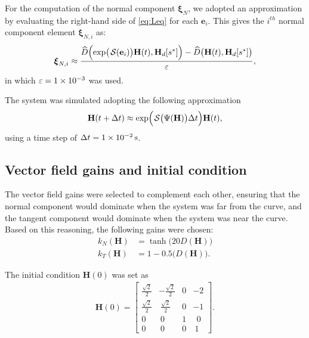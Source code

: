 For the computation of the normal component $\boldsymbol{\xi}_N$, we adopted an approximation by evaluating the right-hand side of \eqref{eq:Leq} for each $\mathbf{e}_i$. This gives the $i^{th}$ normal component element $\boldsymbol{\xi}_{N,i}$ as:
\begin{align}
    \boldsymbol{\xi}_{N,i} \approx \frac{\widehat{D}\Bigl(\exp\bigl(\SL[\boldsymbol{\mathbf{e}}_i]\bigr)\mathbf{H}(t), \mathbf{H}_d[s^*]\Bigr) - \widehat{D}\bigl(\mathbf{H}(t), \mathbf{H}_d[s^*]\bigr)}{\varepsilon},
\end{align} 
in which $\varepsilon = \num{1E-3}$ was used.

The system was simulated adopting the following approximation
\begin{align}
    \mathbf{H}(t + \Delta t) \approx \exp\Bigl(\SL\bigl(\Psi(\mathbf{H})\bigr)\Delta t\Bigr)\mathbf{H}(t),
\end{align}
using a time step of $\Delta t = \qty{1E-2}{\second}$. 
\subsection{Vector field gains and initial condition}
The vector field gains were selected to complement each other, ensuring that the normal component would dominate when the system was far from the curve, and the tangent component would dominate when the system was near the curve. Based on this reasoning, the following gains were chosen:
\begin{align}
    k_N(\mathbf{H}) &= \tanh\bigl(20D(\mathbf{H})\bigr)\\
    k_T(\mathbf{H}) &= 1 - 0.5\bigl(D(\mathbf{H})\bigr).
\end{align}

The initial condition $\mathbf{H}(0)$ was set as
\begin{align}
    \mathbf{H}(0) = \begin{bmatrix}
        \frac{\sqrt{2}}{2} & -\frac{\sqrt{2}}{2} & 0 & -2\\
        \frac{\sqrt{2}}{2} & \ \frac{\sqrt{2}}{2} & 0 & -1\\
        0 & \ 0 & 1 & \ \ 0\\
        0 & \ 0 & 0 & \ 1
    \end{bmatrix}.
\end{align}
